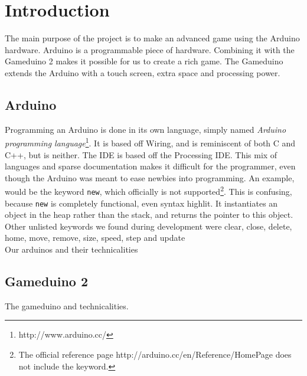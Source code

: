 \chapter{Introduction}
The main purpose of the project is to make an advanced game using the Arduino hardware.
Arduino is a programmable piece of hardware. Combining it with the  Gameduino 2 makes
it possible for us to create a rich game. The Gameduino extends the Arduino with a
touch screen, extra space and processing power.
\section{Arduino}
Programming an Arduino is done in its own language, simply named \emph{Arduino programming language}\footnote{http://www.arduino.cc/}. It is based off Wiring, and is reminiscent of both C and C++, but is neither. The IDE is based off the Processing IDE. This mix of languages and sparse documentation makes it difficult for the programmer, even though the Arduino was meant to ease newbies into programming. An example, would be the keyword {\tt new}, which officially is not supported\footnote{The official reference page http://arduino.cc/en/Reference/HomePage does not include the keyword.}. This is confusing, because {\tt new} is completely functional, even syntax highlit. It instantiates an object in the heap rather than the stack, and returns the pointer to this object. Other unlisted keywords we found during development were clear, close, delete, home, move, remove, size, speed, step and update\\ %
Our arduinos and their technicalities
\section{Gameduino 2}
The gameduino and technicalities.